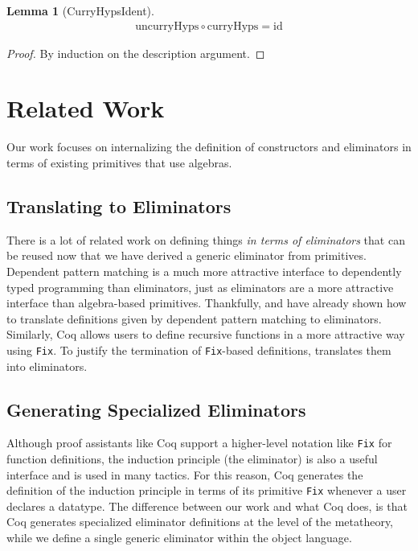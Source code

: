 \documentclass[preprint,nonatbib]{sigplanconf}
\newtheorem*{mylem}{Lemma}
\begin{document}
\begin{mylem}[CurryHypsIdent]
\begin{align*}
\textrm{uncurryHyps} \circ \textrm{curryHyps} = \textrm{id}
\end{align*}
\end{mylem}

\begin{proof}
By induction on the description argument.
\end{proof}



\section{Related Work}
\label{sec:related-work}

Our work focuses on internalizing the definition of constructors and
eliminators in terms of existing primitives that use algebras. 

\subsection{Translating to Eliminators}

There is a lot of related work on defining things
{\it in terms of eliminators} that can be reused now that we have
derived a generic eliminator from primitives.
Dependent pattern matching is a much more attractive interface to
dependently typed programming than eliminators, just as eliminators
are a more attractive interface than algebra-based primitives.
Thankfully, \citet{Goguen06eliminatingdependent} and
\citet{McBride:2000:EM:646540.759262} have already shown how to
translate definitions given by dependent pattern matching to
eliminators.
Similarly, {\sc Coq} allows users to define recursive functions in a
more attractive way using {\tt Fix}. To justify the termination of
{\tt Fix}-based definitions, \citet{gimenez1995codifying} translates
them into eliminators. 

\subsection{Generating Specialized Eliminators}

Although proof assistants like {\sc Coq} support a higher-level
notation like {\tt Fix} for function definitions, the induction
principle (the eliminator) is also a useful interface and is used in 
many tactics. For this reason, {\sc Coq} generates the definition
of the induction principle in terms of its primitive {\tt Fix}
whenever a user declares a datatype. The difference between our work
and what {\sc Coq} does,  is that {\sc Coq} generates
specialized eliminator definitions at the level of the metatheory,
while we define a single generic eliminator within the object
language.
\end{document}
